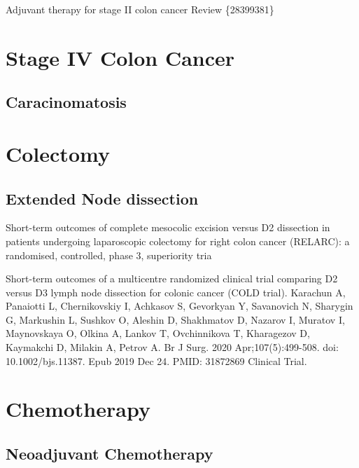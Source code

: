 \documentclass[
]{book}
\begin{document}
Adjuvant therapy for stage II colon cancer Review \{28399381\}

\hypertarget{stage-iv-colon-cancer}{%
\chapter{Stage IV Colon Cancer}\label{stage-iv-colon-cancer}}

\hypertarget{caracinomatosis}{%
\section{Caracinomatosis}\label{caracinomatosis}}

\hypertarget{colectomy-1}{%
\chapter{Colectomy}\label{colectomy-1}}

\hypertarget{extended-node-dissection}{%
\section{Extended Node dissection}\label{extended-node-dissection}}

Short-term outcomes of complete mesocolic excision versus D2 dissection in patients undergoing laparoscopic colectomy for right colon cancer (RELARC): a randomised, controlled, phase 3, superiority tria

Short-term outcomes of a multicentre randomized clinical trial comparing D2 versus D3 lymph node dissection for colonic cancer (COLD trial).
Karachun A, Panaiotti L, Chernikovskiy I, Achkasov S, Gevorkyan Y, Savanovich N, Sharygin G, Markushin L, Sushkov O, Aleshin D, Shakhmatov D, Nazarov I, Muratov I, Maynovskaya O, Olkina A, Lankov T, Ovchinnikova T, Kharagezov D, Kaymakchi D, Milakin A, Petrov A.
Br J Surg. 2020 Apr;107(5):499-508. doi: 10.1002/bjs.11387. Epub 2019 Dec 24.
PMID: 31872869 Clinical Trial.

\hypertarget{chemotherapy}{%
\chapter{Chemotherapy}\label{chemotherapy}}

\hypertarget{neoadjuvant-chemotherapy}{%
\section{Neoadjuvant Chemotherapy}\label{neoadjuvant-chemotherapy}}
\end{document}
